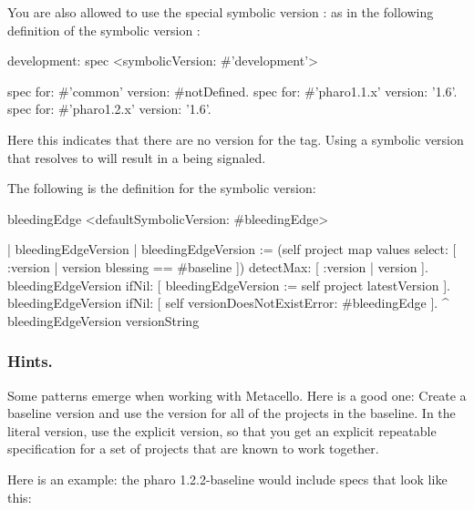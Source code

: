 \documentclass[a4paper,10pt,twoside]{book}
\begin{document}
You are also allowed to use the special symbolic version : as in the following definition of the symbolic version :

\begin{code}{}
development: spec
	<symbolicVersion: #'development'>

	spec for: #'common' version: #notDefined.
	spec for: #'pharo1.1.x' version: '1.6'.
	spec for: #'pharo1.2.x' version: '1.6'.
\end{code}

Here this indicates that there are no version for the  tag. 
Using a symbolic version that resolves to  will result in a  being signaled.

The following is the definition for the  symbolic version: 

\begin{code}{}
bleedingEdge
	<defaultSymbolicVersion: #bleedingEdge>

	| bleedingEdgeVersion |
	bleedingEdgeVersion := (self project map values select: [ :version |
version blessing == #baseline ])
		detectMax: [ :version | version ].
	bleedingEdgeVersion ifNil: [ bleedingEdgeVersion := self project
latestVersion ].
	bleedingEdgeVersion
		ifNil: [ self versionDoesNotExistError: #bleedingEdge ].
	^ bleedingEdgeVersion versionString
\end{code}


\subsubsection{Hints.}
Some patterns emerge when working with Metacello. Here is a good one: 
Create a baseline version and use the  version for all of the projects in the baseline. In the literal version, use the explicit version, so that you get an explicit repeatable specification for a set of projects that are known to work together.

Here is an example: the pharo 1.2.2-baseline would include specs that look like this:
\end{document}
